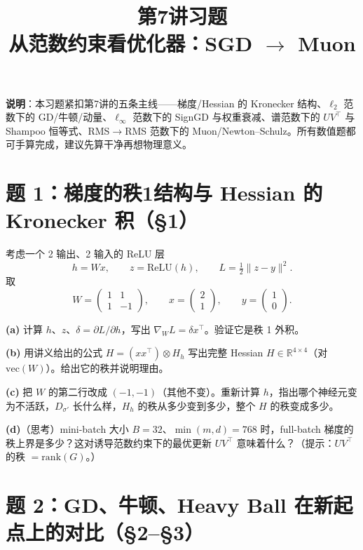 \documentclass[12pt,a4paper]{article}
\title{\LARGE 第7讲习题 \\[6pt] \large 从范数约束看优化器：SGD $\to$ Muon}
\date{}
\begin{document}
\maketitle

\textbf{说明}：本习题紧扣第7讲的五条主线——梯度/Hessian 的 Kronecker 结构、$\ell_2$ 范数下的 GD/牛顿/动量、$\ell_\infty$ 范数下的 SignGD 与权重衰减、谱范数下的 $UV^\top$ 与 Shampoo 恒等式、RMS$\to$RMS 范数下的 Muon/Newton–Schulz。所有数值题都可手算完成，建议先算干净再想物理意义。

\vspace{6pt}

\section*{题 1：梯度的秩1结构与 Hessian 的 Kronecker 积（§1）}

考虑一个 2 输出、2 输入的 ReLU 层
\[
h = W x, \qquad z = \mathrm{ReLU}(h), \qquad L = \tfrac{1}{2}\|z - y\|^2.
\]
取
\[
W = \begin{pmatrix} 1 & 1 \\ 1 & -1 \end{pmatrix},\qquad x = \begin{pmatrix} 2 \\ 1 \end{pmatrix},\qquad y = \begin{pmatrix} 1 \\ 0 \end{pmatrix}.
\]

\textbf{(a)} 计算 $h$、$z$、$\delta = \partial L/\partial h$，写出 $\nabla_W L = \delta x^\top$。验证它是秩 1 外积。

\textbf{(b)} 用讲义给出的公式 $H = (xx^\top) \otimes H_h$ 写出完整 Hessian $H \in \mathbb{R}^{4 \times 4}$（对 $\mathrm{vec}(W)$）。给出它的秩并说明理由。

\textbf{(c)} 把 $W$ 的第二行改成 $(-1, -1)$（其他不变）。重新计算 $h$，指出哪个神经元变为不活跃，$D_{\sigma'}$ 长什么样，$H_h$ 的秩从多少变到多少，整个 $H$ 的秩变成多少。

\textbf{(d)}（思考）mini-batch 大小 $B = 32$、$\min(m, d) = 768$ 时，full-batch 梯度的秩上界是多少？这对诱导范数约束下的最优更新 $UV^\top$ 意味着什么？（提示：$UV^\top$ 的秩 $= \mathrm{rank}(G)$。）

\section*{题 2：GD、牛顿、Heavy Ball 在新起点上的对比（§2–§3）}
\end{document}
